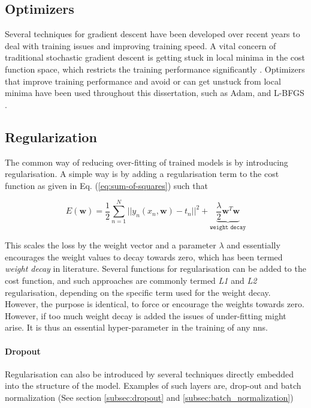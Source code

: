 \subsection{Optimizers}\label{subsec:optimizers}
Several techniques for gradient descent have been developed over recent years to deal with training issues and improving training speed. A vital concern of traditional stochastic gradient descent is getting stuck in local minima in the cost function space, which restricts the training performance significantly \cite{Goodfellow-et-al-2016}. Optimizers that improve training performance and avoid or can get unstuck from local minima have been used throughout this dissertation, such as Adam, and L-BFGS \cite{Goodfellow-et-al-2016}. 

\subsection{Regularization}\label{sec:regularization}
The common way of reducing over-fitting of trained models is by introducing regularisation. A simple way is by adding a regularisation term to the cost function as given in Eq. (\ref{eq:sum-of-squares}) such that

\begin{equation}
    E(\mathbf{w}) = \frac{1}{2}\sum_{n=1}^N ||y_n(x_n,\mathbf{w}) - t_n ||^2 + \underbrace{\frac{\lambda}{2} \mathbf{w}^T \mathbf{w}}_{\texttt{weight decay}}
\end{equation}

This scales the loss by the weight vector and a parameter $\lambda$ and essentially encourages the weight values to decay towards zero, which has been termed \emph{weight decay} in literature. Several functions for regularisation can be added to the cost function, and such approaches are commonly termed \emph{L1} and \emph{L2} regularisation, depending on the specific term used for the weight decay. However, the purpose is identical, to force or encourage the weights towards zero. However, if too much weight decay is added the issues of under-fitting might arise. It is thus an essential hyper-parameter in the training of any \glspl{nn}.

\paragraph{Dropout}
Regularisation can also be introduced by several techniques directly embedded into the structure of the model. Examples of such layers are, drop-out and batch normalization (See section \ref{subsec:dropout} and \ref{subsec:batch_normalization})

